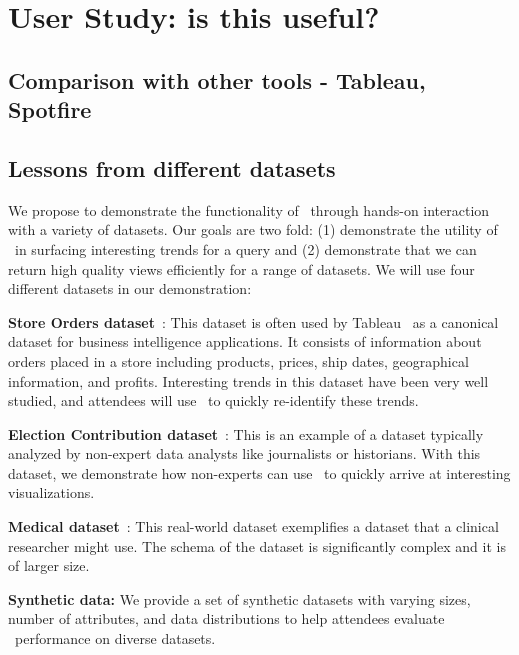 \section{User Study: is this useful?}
\subsection{Comparison with other tools - Tableau, Spotfire}
\subsection{Lessons from different datasets}
We propose to demonstrate the functionality of \SeeDB\ through hands-on
interaction with a variety of datasets. Our goals are two fold: (1) demonstrate
the utility of \SeeDB\ in surfacing interesting trends for a query
and (2) demonstrate that we can return high quality views efficiently for
a range of datasets. We will use four different datasets in our demonstration:

\begin{denselist}
  \item {\bf Store Orders dataset}~\cite{superstore}: This dataset is
    often used by Tableau~\cite{tableau} as a canonical dataset for
    business intelligence applications. It consists of information
    about orders placed in a store including products, prices, ship
    dates, geographical information, and profits. Interesting trends in
    this dataset have been very well studied, and attendees will use
    \SeeDB\ to quickly re-identify these trends. 
  \item {\bf Election Contribution dataset}~\cite{election_data}: This
  is an example of a dataset typically analyzed by
    non-expert data analysts like journalists or historians. With this
    dataset, we demonstrate how non-experts can use \SeeDB\ to quickly
    arrive at interesting visualizations.
  \item {\bf Medical dataset}~\cite{mimic}: This real-world dataset exemplifies
  a dataset that a clinical researcher might use. The schema of the dataset is
  significantly complex and it is of larger size.  
    \item {\bf Synthetic data:} We provide a set of synthetic datasets with
    varying sizes, number of attributes, and data distributions to help
    attendees evaluate \SeeDB\ performance on diverse datasets.
\end{denselist}

